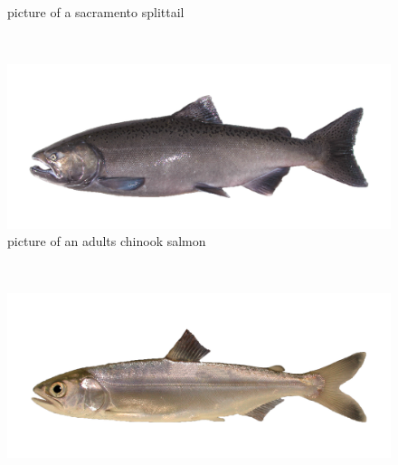 \documentclass[
]{book}
\begin{document}
\begin{panel-grid}
\begin{columns-nocenter}
\begin{column800}
\begin{figure}
{}

\caption{picture of a sacramento splittail}\label{fig:unnamed-chunk-32}
\end{figure}

\end{column800}

\begin{column40}

~

\end{column40}

\begin{column800}

\begin{figure}

{\centering \includegraphics[width=29.17in]{figures/chinook_salmon} 

}

\caption{picture of an adults chinook salmon}\label{fig:unnamed-chunk-33}
\end{figure}

\end{column800}

\begin{column40}

~

\end{column40}

\begin{column800}

\begin{figure}

{\centering \includegraphics[width=29.17in]{figures/chinook_salmon_smolt} 

}
\end{figure}
\end{column800}
\end{columns-nocenter}
\end{panel-grid}
\end{document}
